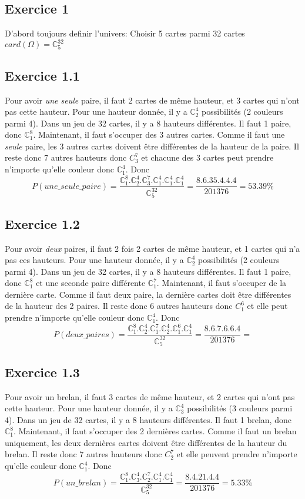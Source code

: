 \documentclass[]{book}
\theoremstyle{definition}
\newcommand{\bb}[1]{\mathbb{#1}}
\newcommand{\C}{\bb{C}}
\begin{document}
\subsection*{Exercice 1}
D'abord toujours definir l'univers: Choisir 5 cartes parmi 32 cartes $card(\Omega)=\C_5^32$

\subsection*{Exercice 1.1}
Pour avoir \emph{une seule} paire, il faut 2 cartes de m\^eme hauteur, et 3 cartes qui n'ont pas cette hauteur. Pour une hauteur donn\'ee, il y a $\C_2^4$ possibilit\'es (2 couleurs parmi 4). Dans un jeu de 32 cartes, il y a 8 hauteurs diff\'erentes. Il faut 1 paire, donc $\C_1^8$. Maintenant, il faut s'occuper des 3 autres cartes. Comme il faut une \emph{seule} paire, les 3 autres cartes doivent \^etre diff\'erentes de la hauteur de la paire. Il reste donc 7 autres hauteurs donc $C_3^7$ et chacune des 3 cartes peut prendre n'importe qu'elle couleur donc $\C_1^4$. Donc
$$P(une\_seule\_paire) = \frac{\C_1^8.\C_2^4.\C_3^7.\C_1^4.\C_1^4.\C_1^4}{\C_5^{32}} = \frac{8.6.35.4.4.4}{201376} = 53.39\%$$

\subsection*{Exercice 1.2}
Pour avoir \emph{deux} paires, il faut 2 fois 2 cartes de m\^eme hauteur, et 1 cartes qui n'a pas ces hauteurs. Pour une hauteur donn\'ee, il y a $\C_2^4$ possibilit\'es (2 couleurs parmi 4). Dans un jeu de 32 cartes, il y a 8 hauteurs diff\'erentes. Il faut 1 paire, donc $\C_1^8$ et une seconde paire diff\'erente $\C_1^7$. Maintenant, il faut s'occuper de la derni\`ere carte. Comme il faut deux paire, la derni\`ere cartes doit \^etre diff\'erentes de la hauteur des 2 paires. Il reste donc 6 autres hauteurs donc $C_1^6$ et elle peut prendre n'importe qu'elle couleur donc $\C_1^4$. Donc
$$P(deux\_paires) = \frac{\C_1^8.\C_2^4.\C_1^7.\C_2^4.\C_1^6.\C_1^4}{\C_5^{32}} = \frac{8.6.7.6.6.4}{201376} = $$


\subsection*{Exercice 1.3}
Pour avoir un brelan, il faut 3 cartes de m\^eme hauteur, et 2 cartes qui n'ont pas cette hauteur. Pour une hauteur donn\'ee, il y a $\C_3^4$ possibilit\'es (3 couleurs parmi 4). Dans un jeu de 32 cartes, il y a 8 hauteurs diff\'erentes. Il faut 1 brelan, donc $\C_1^8$. Maintenant, il faut s'occuper des 2 derni\`eres cartes. Comme il faut un brelan uniquement, les deux derni\`eres cartes doivent \^etre diff\'erentes de la hauteur du brelan. Il reste donc 7 autres hauteurs donc $C_2^7$ et elle peuvent prendre n'importe qu'elle couleur donc $\C_1^4$. Donc
$$P(un\_brelan) = \frac{\C_1^8.\C_3^4.\C_2^7.\C_1^4.\C_1^4}{\C_5^{32}} = \frac{8.4.21.4.4}{201376} = 5.33\%$$
\end{document}
